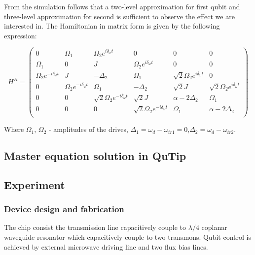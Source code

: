 \documentclass[%
 aip,
 amsmath,amssymb,
 reprint,%
]{revtex4-1}
\begin{document}
From the simulation follows that a two-level approximation for first qubit and three-level approximation for second is sufficient to observe the effect we are interested in. The Hamiltonian in matrix form is given by the following expression:
\begin{widetext}
	\begin{equation}\label{matrix} 
	\text{$H^R$} = \left(\begin{matrix}
	0 & \text{$\Omega_1 $} & \text{$\Omega _2$} e^{i \text{$\delta_{\omega}$} t} & 0 & 0 & 0 \\
	\text{$\Omega_1 $} & 0 & J & \text{$\Omega_2$} e^{i \text{$\delta_{\omega}$} t} & 0 & 0 \\
	\text{$\Omega_2$} e^{-i \text{$\delta_{\omega} $} t} & J & -\text{$\Delta_2 $} &
	\text{$\Omega_1$} & \sqrt{2} \text{$\Omega_2$} e^{i \text{$\delta_{\omega}$} t} & 0 \\
	0 & \text{$\Omega_2$} e^{-i \text{$\delta_{\omega} $} t} & \text{$\Omega_1$} &
	-\text{$\Delta_2 $} & \sqrt{2} J & \sqrt{2} \text{$\Omega_2$} e^{i \text{$\delta_{\omega}
			$} t} \\
	0 & 0 & \sqrt{2} \text{$\Omega_2$} e^{-i \text{$\delta_{\omega}$} t} & \sqrt{2} J &
	\text{$\alpha$}-2 \text{$\Delta_2$} & \text{$\Omega_1$} \\
	0 & 0 & 0 & \sqrt{2} \text{$\Omega_2$} e^{-i \text{$\delta_{\omega} $} t} & \text{$\Omega_1
		$} & \text{$\alpha$}-2 \text{$\Delta_2$} \\
	\end{matrix}\right)
	\end{equation}
\end{widetext}
Where $\Omega_1$, $\Omega_2$ - amplitudes of the drives, $\Delta_1 = \omega_d-\omega_{tr1}=0$,$\Delta_2 = \omega_d-\omega_{tr2}$.

\subsection{Master equation solution in QuTip}

\subsection{Experiment}
\subsubsection{Device design and fabrication}
The chip consist the transmission line capacitively couple to $\lambda/4$ coplanar waveguide resonator which capacitively couple to two transmons. Qubit control is achieved by external microwave driving line and two flux bias lines. 
\end{document}
